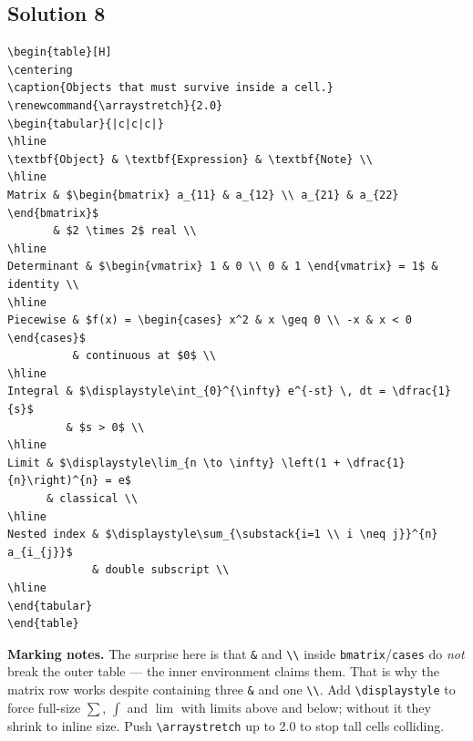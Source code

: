 \documentclass[11pt]{article}
\begin{document}
\subsection*{Solution 8}
\begin{lstlisting}[style=tex]
\begin{table}[H]
\centering
\caption{Objects that must survive inside a cell.}
\renewcommand{\arraystretch}{2.0}
\begin{tabular}{|c|c|c|}
\hline
\textbf{Object} & \textbf{Expression} & \textbf{Note} \\
\hline
Matrix & $\begin{bmatrix} a_{11} & a_{12} \\ a_{21} & a_{22} \end{bmatrix}$
       & $2 \times 2$ real \\
\hline
Determinant & $\begin{vmatrix} 1 & 0 \\ 0 & 1 \end{vmatrix} = 1$ & identity \\
\hline
Piecewise & $f(x) = \begin{cases} x^2 & x \geq 0 \\ -x & x < 0 \end{cases}$
          & continuous at $0$ \\
\hline
Integral & $\displaystyle\int_{0}^{\infty} e^{-st} \, dt = \dfrac{1}{s}$
         & $s > 0$ \\
\hline
Limit & $\displaystyle\lim_{n \to \infty} \left(1 + \dfrac{1}{n}\right)^{n} = e$
      & classical \\
\hline
Nested index & $\displaystyle\sum_{\substack{i=1 \\ i \neq j}}^{n} a_{i_{j}}$
             & double subscript \\
\hline
\end{tabular}
\end{table}
\end{lstlisting}
\textbf{Marking notes.} The surprise here is that \verb|&| and \verb|\\| inside
\texttt{bmatrix}/\texttt{cases} do \emph{not} break the outer table --- the inner
environment claims them. That is why the matrix row works despite containing
three \verb|&| and one \verb|\\|. Add \verb|\displaystyle| to force full-size
$\sum$, $\int$ and $\lim$ with limits above and below; without it they shrink to
inline size. Push \verb|\arraystretch| up to 2.0 to stop tall cells colliding.
\end{document}
